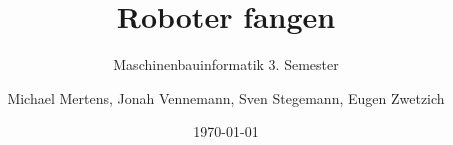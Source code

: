 \documentclass[titlepage=true,11pt,a4paper]{scrartcl}
\begin{document}
	\vfill
	\subject{Dokumentation}
	\title{Roboter fangen}
	\subtitle{Maschinenbauinformatik 3. Semester}
	\author{Michael Mertens, Jonah Vennemann, Sven Stegemann, Eugen Zwetzich}
	\date{\today}
	\maketitle
	\newpage
	\setcounter{page}{1}
	\tableofcontents
	\newpage
		
	
	
\end{document}
